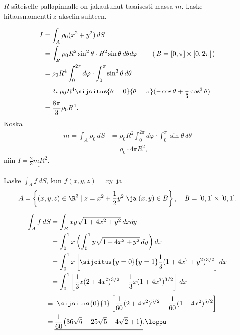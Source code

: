 \begin{Exa}
$R$-säteiselle pallopinnalle on jakautunut tasaisesti massa $m$. Laske hitausmomentti 
$z$-akselin suhteen.
\end{Exa}
\ratk
\begin{align*}
I &= \int_A \rho_0(x^2+y^2)\,dS \\
&= \int_B \rho_0 R^2\sin^2\theta\cdot R^2\sin\theta\,d\theta d\varphi 
   \qquad \left(\,B=[0,\pi]\times[0,2\pi]\,\right) \\
&= \rho_0 R^4 \int_0^{2\pi} d\varphi \cdot \int_0^\pi \sin^3 \theta\,d\theta \\
&= 2\pi\rho_0R^4\sijoitus{\theta=0}{\theta=\pi} (-\cos\theta+\frac{1}{3}\cos^3\theta) \\
&= \frac{8\pi}{3}\rho_0 R^4.
\end{align*}
Koska
\begin{align*}
m =\int_A \rho_0\,dS
 &= \rho_0 R^2 \int_0^{2\pi} d\varphi \cdot \int_0^{\pi} \sin\theta\,d\theta \\
 &= \rho_0\cdot 4\pi R^2,
\end{align*}
niin $\displaystyle{I=\underline{\underline{\frac{2}{3}mR^2}}}$. \loppu
\begin{Exa}
Laske $\int_A f\,dS$, kun $f(x,y,z)=xy\ $ ja
\[
A = \left\{(x,y,z)\in\R^3 \mid z=x^2+\frac{1}{2}y^2 \; \ja \; (x,y)\in B\right\},
    \quad B=[0,1]\times [0,1].
\]
\end{Exa}
\ratk
\begin{align*}
\int_A f\,dS &= \int_B xy\sqrt{1+4x^2+y^2}\,dxdy \\
&=\int_0^1 x\left(\int_0^1 y\sqrt{1+4x^2+y^2}\,dy\right)dx \\
&=\int_0^1 x\left[\sijoitus{y=0}{y=1}\frac{1}{3}(1+4x^2+y^2)^{3/2}\right]dx \\
&=\int_0^1 \left[\frac{1}{3}x(2+4x^2)^{3/2}-\frac{1}{3}x(1+4x^2)^{3/2}\right]\,dx
\end{align*}
\begin{align*}
\quad &=\ \sijoitus{0}{1}\left[\frac{1}{60}(2+4x^2)^{5/2}-\frac{1}{60}(1+4x^2)^{5/2}\right] \\
      &= \underline{\underline{\frac{1}{60}\bigl(36\sqrt{6}-25\sqrt{5}-4\sqrt{2}+1\bigr)}}.
\loppu \\
\end{align*}


